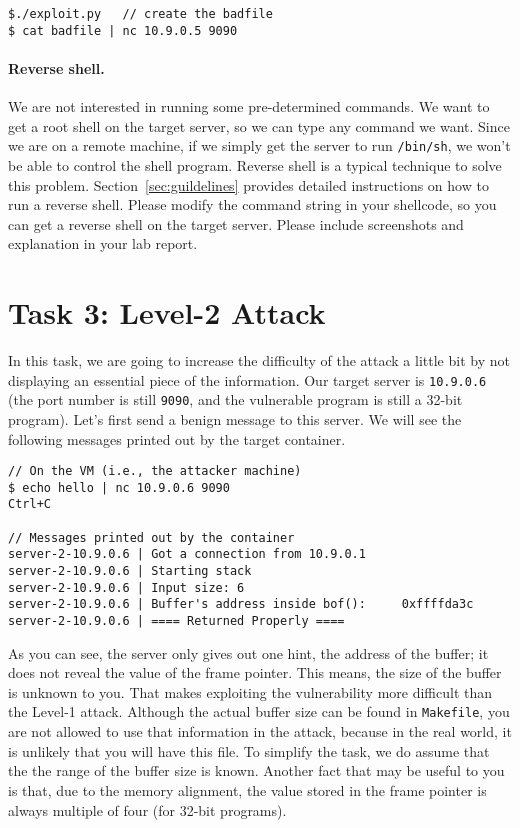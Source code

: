 \begin{lstlisting}
$./exploit.py   // create the badfile
$ cat badfile | nc 10.9.0.5 9090
\end{lstlisting}
 

\paragraph{Reverse shell.}
We are not interested in running some pre-determined commands. We 
want to get a root shell on the target server, so we can 
type any command we want. Since we are on a remote machine,
if we simply get the server to run \texttt{/bin/sh}, we won't be able to
control the shell program. Reverse shell is a typical
technique to solve this problem. Section~\ref{sec:guildelines} provides 
detailed instructions on how to run a reverse shell.
Please modify the command string in your shellcode, so you can
get a reverse shell on the target server. 
Please include screenshots and explanation in your lab report.



\section{Task 3: Level-2 Attack} 

In this task, we are going to increase the difficulty
of the attack a little bit by not displaying an essential 
piece of the information. Our target server is 
\texttt{10.9.0.6} (the port number is still \texttt{9090}, and the 
vulnerable program is still a 32-bit program). 
Let's first send a benign message to this server. 
We will see the following messages printed out by the target container. 

\begin{lstlisting}
// On the VM (i.e., the attacker machine)
$ echo hello | nc 10.9.0.6 9090
Ctrl+C

// Messages printed out by the container
server-2-10.9.0.6 | Got a connection from 10.9.0.1
server-2-10.9.0.6 | Starting stack
server-2-10.9.0.6 | Input size: 6
server-2-10.9.0.6 | Buffer's address inside bof():     0xffffda3c
server-2-10.9.0.6 | ==== Returned Properly ====
\end{lstlisting}
 
As you can see, the server only gives out one hint, the 
address of the buffer; it does not reveal the value of the 
frame pointer. This means, the size of the buffer is unknown
to you. That makes exploiting the vulnerability more 
difficult than the Level-1 attack. 
Although the actual buffer size can be found in 
\texttt{Makefile}, you are not allowed to use that 
information in the attack, because in the real world, it is 
unlikely that you will have this file. 
To simplify the task, we do assume that the
the range of the buffer size is known.
Another fact that
may be useful to you is that, due to the memory alignment,
the value stored in the
frame pointer is always multiple of four (for 32-bit programs).



